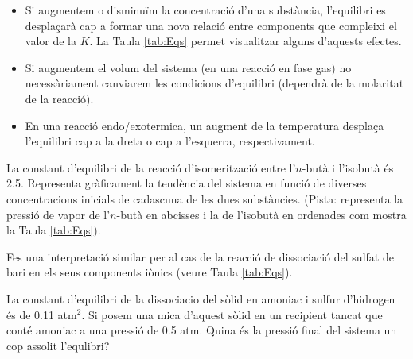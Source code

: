 \begin{itemize}
\item Si augmentem o disminuïm la concentració d'una substància, l'equilibri es desplaçarà cap a formar una nova relació entre components que compleixi el valor de la $K$. La Taula \ref{tab:Eqs} permet visualitzar alguns d'aquests efectes.
\item Si augmentem el volum del sistema (en una reacció en fase gas) no necessàriament canviarem les condicions d'equilibri (dependrà de la molaritat de la reacció).
\item En una reacció endo/exotermica, un augment de la temperatura desplaça l'equilibri cap a la dreta o cap a l'esquerra, respectivament.
\end{itemize}

\begin{exr}
La constant d'equilibri de la reacció d'isomerització entre l'$n$-butà i l'isobutà és 2.5. Representa gràficament la tendència del sistema en funció de diverses concentracions inicials de cadascuna de les dues substàncies. (Pista: representa la pressió de vapor de l'$n$-butà en abcisses i la de l'isobutà en ordenades com mostra la Taula \ref{tab:Eqs}).
\end{exr}

\begin{exr}
Fes una interpretació similar per al cas de la reacció de dissociació del sulfat de bari en els seus components iònics (veure Taula \ref{tab:Eqs}).
\end{exr}

\begin{exr}
La constant d'equilibri de la dissociacio del  sòlid en amoniac i sulfur d'hidrogen és de 0.11 atm$^2$. Si posem una mica d'aquest sòlid en un recipient tancat que conté amoniac a una pressió de 0.5 atm. Quina és la pressió final del sistema un cop assolit l'equlibri?
\end{exr}

